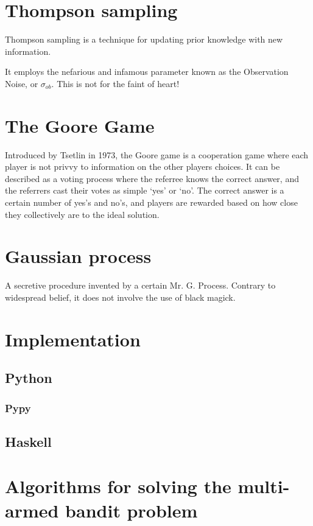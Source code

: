 \section{Thompson sampling}
Thompson sampling is a technique for updating prior knowledge with new 
information.

It employs the nefarious and infamous parameter known as the Observation Noise, 
or $\sigma_{ob}$. This is not for the faint of heart!


\section{The Goore Game}
Introduced by Tsetlin in 1973, the Goore game is a cooperation game where each  
player is not privvy to information on the other players choices. It can be 
described as a voting process where the referree knows the correct answer, and 
the referrers cast their votes as simple ‘yes’ or ‘no’. The correct answer is a 
certain number of yes’s and no’s, and players are rewarded based on how close 
they collectively are to the ideal solution.



\section{Gaussian process}
A secretive procedure invented by a certain Mr. G. Process. Contrary to 
widespread belief, it does not involve the use of black magick.

\section{Implementation}

\subsection{Python}

\subsubsection{Pypy}

\subsection{Haskell}

\section{Algorithms for solving the multi-armed bandit problem}

